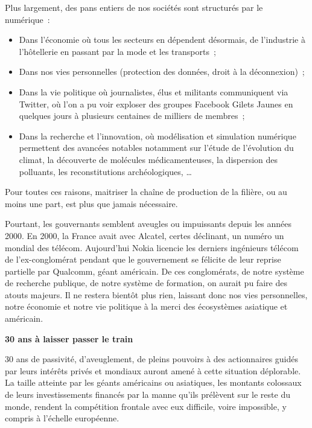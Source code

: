 \documentclass[a4paper]{article}
\begin{document}
Plus largement, des pans entiers de nos sociétés sont structurés par le numérique~:
\begin{itemize}
\item Dans l'économie où tous les secteurs en dépendent désormais, de l'industrie à l'hôtellerie en passant par la mode et les transports~;
\item Dans nos vies personnelles (protection des données, droit à la déconnexion)~;
\item Dans la vie politique où journalistes, élus et militants communiquent via Twitter, où l'on a pu voir exploser des groupes Facebook Gilets Jaunes en quelques jours à plusieurs centaines de milliers de membres~;
\item Dans la recherche et l’innovation, où modélisation et simulation numérique permettent des avancées notables notamment sur l’étude de l’évolution du climat, la découverte de molécules médicamenteuses, la dispersion des polluants, les reconstitutions archéologiques, \ldots
\end{itemize}
Pour toutes ces raisons, maitriser la chaîne de production de la filière, ou au moins une part, est plus que jamais nécessaire.\par

Pourtant, les gouvernants semblent aveugles ou impuissants depuis les années 2000. En 2000, la France avait avec Alcatel, certes déclinant, un numéro un mondial des télécom. Aujourd'hui Nokia licencie les derniers ingénieurs télécom de l’ex-conglomérat pendant que le gouvernement se félicite de leur reprise partielle par Qualcomm, géant américain. 
De ces conglomérats, de notre système de recherche publique, de notre système de formation, on aurait pu faire des atouts majeurs. Il ne restera bientôt plus rien, laissant donc nos vies personnelles, notre économie et notre vie politique à la merci des écosystèmes asiatique et américain. 

\noindent\textbf{30 ans à laisser passer le train}\par

30 ans de passivité, d'aveuglement, de pleins pouvoirs à des actionnaires guidés par leurs intérêts privés et mondiaux auront amené à cette situation déplorable. La taille atteinte par les géants américains ou asiatiques, les montants colossaux de leurs investissements financés par la manne qu'ils prélèvent sur le reste du monde, rendent la compétition frontale avec eux difficile, voire impossible, y compris à l'échelle européenne.
\end{document}
